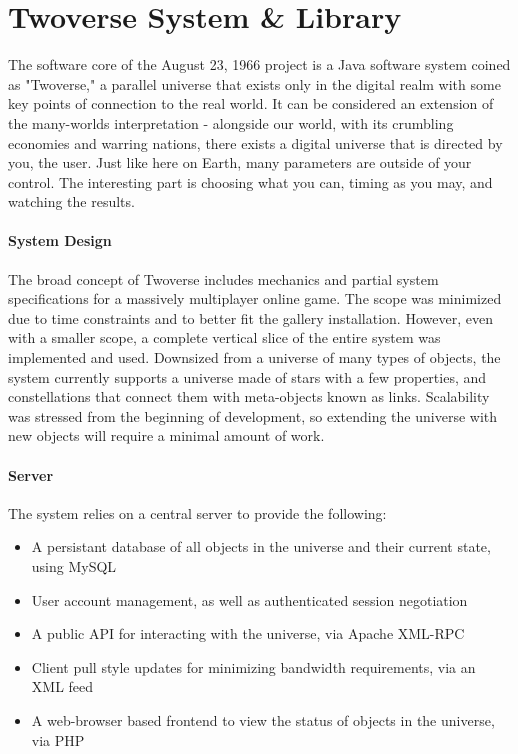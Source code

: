 \section{Twoverse System \& Library}
The software core of the August 23, 1966 project is a Java software system coined as "Twoverse," a parallel universe that exists only in the digital realm with some key points of connection to the real world. It can be considered an extension of the many-worlds interpretation - alongside our world, with its crumbling economies and warring nations, there exists a digital universe that is directed by you, the user. Just like here on Earth, many parameters are outside of your control. The interesting part is choosing what you can, timing as you may, and watching the results.

\paragraph{System Design}
The broad concept of Twoverse includes mechanics and partial system specifications for a massively multiplayer online game. The scope was minimized due to time constraints and to better fit the gallery installation. However, even with a smaller scope, a complete vertical slice of the entire system was implemented and used. Downsized from a universe of many types of objects, the system currently supports a universe made of stars with a few properties, and constellations that connect them with meta-objects known as links. Scalability was stressed from the beginning of development, so extending the universe with new objects will require a minimal amount of work.

\paragraph{Server}
The system relies on a central server to provide the following:
\begin{itemize}
\item A persistant database of all objects in the universe and their current state, using MySQL
\item User account management, as well as authenticated session negotiation
\item A public API for interacting with the universe, via Apache XML-RPC \cite{XMLRPC}
\item Client pull style updates for minimizing bandwidth requirements, via an XML feed
\item A web-browser based frontend to view the status of objects in the universe, via PHP
\end{itemize}

